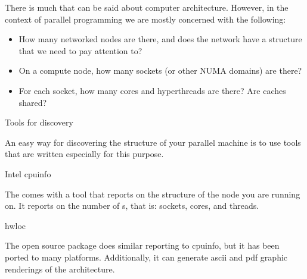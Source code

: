 
There is much that can be said about computer architecture. However,
in the context of parallel programming we are mostly concerned with
the following:
\begin{itemize}
\item How many networked nodes are there, and does the network have a
  structure that we need to pay attention to?
\item On a compute node, how many sockets (or other \ac{NUMA} domains)
  are there?
\item For each socket, how many cores and hyperthreads are there? Are
  caches shared?
\end{itemize}

 {Tools for discovery}

An easy way for discovering the structure of your parallel machine is
to use tools that are written especially for this purpose.

 {Intel cpuinfo}

The  comes with a tool
 that reports on the structure of the node
you are running on. It reports on the number of s,
that is: sockets, cores, and threads.

 {hwloc}

The open source package  does similar reporting to
cpuinfo, but it has been ported to many platforms. Additionally, it
can generate ascii and pdf graphic renderings of the architecture.
